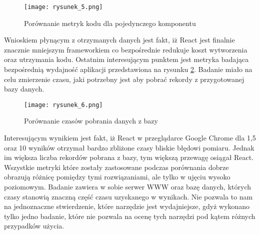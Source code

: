 \begin{figure}[!ht]
    \centering
    \texttt{[image: rysunek\_5.png]}
    \caption{Porównanie metryk kodu dla pojedynczego komponentu \cite{polibuda}}
    \label{fig:rysunek_5}
\end{figure}

Wnioskiem płynącym z otrzymanych danych jest fakt, iż React jest finalnie znacznie mniejszym frameworkiem co bezpośrednie redukuje koszt wytworzenia oraz utrzymania kodu.
Ostatnim interesującym punktem jest metryka badająca bezpośrednią wydajność aplikacji przedstawiona na rysunku \ref{fig:rysunek_6}.
Badanie miało na celu zmierzenie czasu, jaki potrzebny jest aby pobrać rekordy z przygotowanej bazy danych.

\begin{figure}[!ht]
    \centering
    \texttt{[image: rysunek\_6.png]}
    \caption{Porównanie czasów pobrania danych z bazy \cite{polibuda}}
    \label{fig:rysunek_6}
\end{figure}

Interesującym wynikiem jest fakt, iż React w przeglądarce Google Chrome dla 1,5 oraz 10 wyników otrzymał bardzo zbliżone czasy bliskie błędowi pomiaru.
Jednak im większa liczba rekordów pobrana z bazy, tym większą przewagę osiągał React. 
Wszystkie metryki które zostały zastosowane podczas porównania dobrze obrazują różnicę pomiędzy tymi rozwiązaniami, ale tylko w ujęciu wysoko poziomowym.
Badanie zawiera w sobie serwer WWW oraz bazę danych, których czasy stanowią znaczną część czasu uzyskanego w wynikach.
Nie pozwala to nam na jednoznaczne stwierdzenie, które narzędzie jest wydajniejsze, gdyż wykonano tylko jedno badanie, które nie pozwala na ocenę tych narzędzi pod kątem różnych przypadków użycia.
